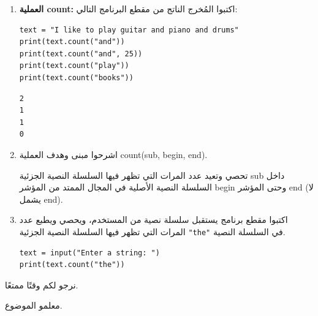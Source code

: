 \documentclass[14pt]{extarticle}
\begin{document}
\begin{enumerate}[resume, label=\textbf{تمرين \arabic*:}, wide=0pt, itemsep=2.2em]
\ifwithsols
\begin{boxSolution}
\begin{english}
\begin{verbatim}
text = input("Enter a string: ")
new_text = text.replace("|", "we", 3)
print(new_text)
\end{verbatim}
\end{english}
\end{boxSolution}
\fi
\filbreak

\item \textbf{العملية \textenglish{count}:}
اكتبوا المُخرج الناتج من مقطع البرنامج التالي:

\begin{boxCode}
\begin{english}
\begin{verbatim}
text = "I like to play guitar and piano and drums"
print(text.count("and"))
print(text.count("and", 25))
print(text.count("play"))
print(text.count("books"))
\end{verbatim}
\end{english}
\end{boxCode}

\ifwithsols
\begin{boxSolution}
\begin{english}
\begin{verbatim}
2
1
1
0
\end{verbatim}
\end{english}
\end{boxSolution}
\fi
\filbreak

\item اشرحوا مبنى وهدف العملية \textenglish{count(sub, begin, end)}.

\ifwithsols
\begin{boxSolution}
تحصي وتعيد عدد المرات التي تظهر فيها السلسلة النصية الجزئية \textenglish{sub} داخل السلسلة النصية الأصلية في المجال الممتد من المؤشر \textenglish{begin} وحتى المؤشر \textenglish{end} (لا يشمل \textenglish{end}).
\end{boxSolution}
\fi
\filbreak

\item اكتبوا مقطع برنامج يستقبل سلسلة نصية من المستخدم، ويحصي ويطبع عدد المرات التي تظهر فيها السلسلة النصية الجزئية \textenglish{\texttt{"the"}} في السلسلة النصية.

\ifwithsols
\begin{boxSolution}
\begin{english}
\begin{verbatim}
text = input("Enter a string: ")
print(text.count("the"))
\end{verbatim}
\end{english}
\end{boxSolution}
\fi
\filbreak

\end{enumerate}

\vspace{1cm}
\begin{flushleft}
نرجو لكم وقتًا ممتعًا.

معلمو الموضوع.
\end{flushleft}
\end{document}

